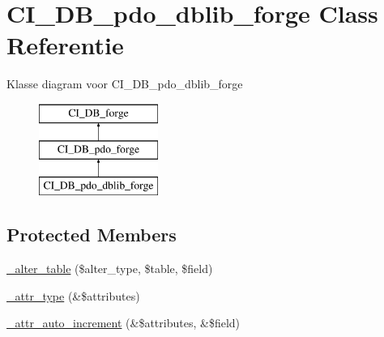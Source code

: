 \hypertarget{class_c_i___d_b__pdo__dblib__forge}{}\section{C\+I\+\_\+\+D\+B\+\_\+pdo\+\_\+dblib\+\_\+forge Class Referentie}
\label{class_c_i___d_b__pdo__dblib__forge}
Klasse diagram voor C\+I\+\_\+\+D\+B\+\_\+pdo\+\_\+dblib\+\_\+forge\begin{figure}[H]
\begin{center}
\leavevmode
\includegraphics[height=3.000000cm]{class_c_i___d_b__pdo__dblib__forge}
\end{center}
\end{figure}
\subsection*{Protected Members}
\begin{DoxyCompactItemize}
\item 
\mbox{\hyperlink{class_c_i___d_b__pdo__dblib__forge_a41c6cae02f2fda8b429ad0afb9509426}{\+\_\+alter\+\_\+table}} (\$alter\+\_\+type, \$table, \$field)
\item 
\mbox{\hyperlink{class_c_i___d_b__pdo__dblib__forge_a8553be952084c6f7cdfff370a1d14f6b}{\+\_\+attr\+\_\+type}} (\&\$attributes)
\item 
\mbox{\hyperlink{class_c_i___d_b__pdo__dblib__forge_a2a013a5932439c3c44f0dad3436525f7}{\+\_\+attr\+\_\+auto\+\_\+increment}} (\&\$attributes, \&\$field)
\end{DoxyCompactItemize}
